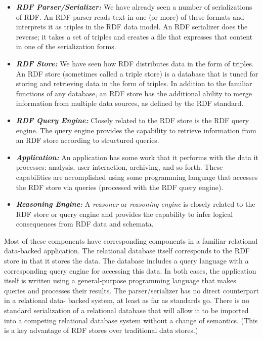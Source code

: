 \begin{itemize}
\item
  \emph{\textbf{RDF Parser/Serializer:}} We have already seen a number
  of serializations of RDF. An RDF parser reads text in one (or more) of these formats and
  interprets it as triples in the RDF data model. An RDF serializer does the reverse; it takes a set of triples and
creates a file that expresses that content in one of the serialization
forms.
\item
  \emph{\textbf{RDF Store:}} We have seen how RDF distributes data in
  the form of triples. An RDF store (sometimes called a triple store) is
  a database that is tuned for storing and retrieving data in the form
  of triples. In addition to the familiar functions of any database, an
  RDF store has the additional ability to merge information from
  multiple data sources, as defined by the RDF standard.
\item
  \emph{\textbf{RDF Query Engine:}} Closely related to the RDF store is
  the RDF query engine. The query engine provides the capability to
  retrieve information from an RDF store according to structured
  queries.
\item
  \emph{\textbf{Application:}} An application has some work that it
  performs with the data it processes: analysis, user interaction,
  archiving, and so forth. These capabilities are accomplished using
  some programming language that accesses the RDF store via queries
  (processed with the RDF query engine).
\item
  \emph{\textbf{Reasoning Engine:}} A \emph{reasoner} or \emph{reasoning engine} is closely related to the RDF store or
  query engine and provides the capability to infer logical consequences
  from RDF data and schemata.
\end{itemize}

Most of these components have corresponding components in a familiar
relational data-backed application. The relational database itself
corresponds to the RDF store in that it stores the data. The database
includes a query language with a corresponding query engine for
accessing this data. In both cases, the application itself is written
using a general-purpose programming language that makes queries and
processes their results. The parser/serializer has no direct counterpart
in a relational data- backed system, at least as far as standards go.
There is no standard serialization of a relational database that will
allow it to be imported into a competing relational database system
without a change of semantics. (This is a key advantage of RDF stores
over traditional data stores.)

